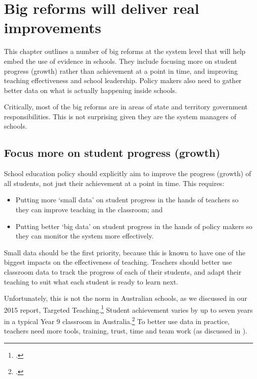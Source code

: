 \chapter{Big reforms will deliver real improvements}\label{chap:Specific-reforms}

This chapter outlines a number of big reforms at the system level that will help embed the use of evidence in schools. They include focusing more on student progress (growth) rather than achievement at a point in time, and improving teaching effectiveness and school leadership. Policy makers also need to gather better data on what is actually happening inside schools.

Critically, most of the big reforms are in areas of state and territory government responsibilities. This is not surprising given they are the system managers of schools.

\section{Focus more on student progress (growth)}\label{sec:Focus-more-on-student-progress-growth}

School education policy should explicitly aim to improve the progress (growth) of all students, not just their achievement at a point in time. This requires:

\begin{itemize}
    \item Putting more `small data' on student progress in the hands of teachers so they can improve teaching in the classroom; and
    \item Putting better `big data' on student progress in the hands of policy makers so they can monitor the system more effectively.
    
\end{itemize}

Small data should be the first priority, because this is known to have one of the biggest impacts on the effectiveness of teaching. Teachers should better use classroom data to track the progress of each of their students, and adapt their teaching to suit what each student is ready to learn next. 

Unfortunately, this is not the norm in Australian schools, as we discussed in our 2015 report, Targeted Teaching.\footcite{Goss2015TargetedTeachingHow}
Student achievement varies by up to seven years in a typical Year 9 classroom in Australia.\footcite{Goss2016Wideninggapswhat}
To better use data in practice, teachers need more tools, training, trust, time and team work (as discussed in ).

